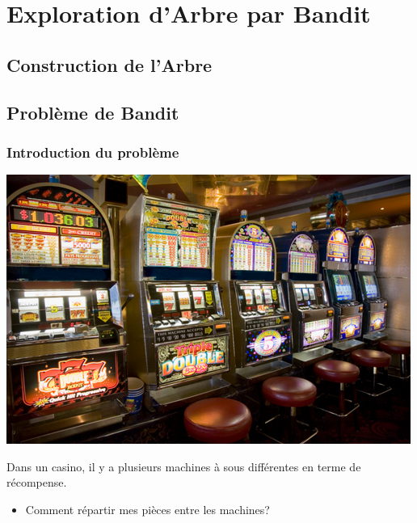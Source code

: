 \documentclass[compress, color = usenames, dvipsnames]{beamer}
\begin{document}





\section{Exploration d'Arbre par Bandit}

\subsection{Construction de l'Arbre}


\subsection{Problème de Bandit}

\begin{frame}
    \frametitle{Introduction du problème}
    \begin{center}
        \includegraphics[scale=0.8]{figs/bandit_casino.jpg}
    \end{center}
    Dans un casino, il y a plusieurs machines à sous différentes en terme de récompense.
    \begin{itemize}
        \item Comment répartir mes pièces entre les machines?
    \end{itemize}
\end{frame}
\end{document}
